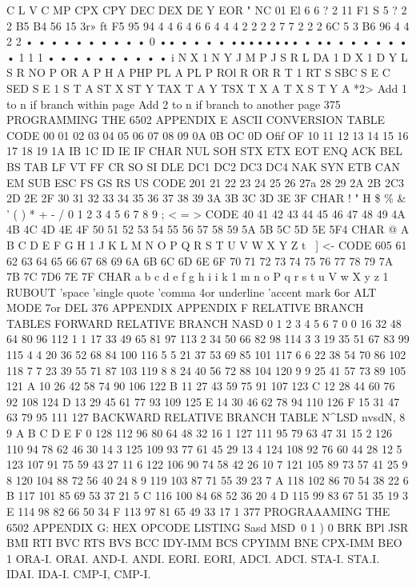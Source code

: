 \documentclass{book}
\begin{document}
{{{{{{{{{{{{{{{{{{{{{{{{{{{{{{{{{{{{{{{{{{{{{{{{{{{{{{{{{{{{{{{{{{{{{{{{{{{{{{{{{{{{{{{{{{{{{{{{{{{{{{{{{{{{{{{{{{{{{{{{{{{{{{{{{{{{{{{{{{{{C L V
C MP
CPX
CPY
DEC
DEX
DE Y
EOR
" NC
01
El
6
6
?
2
11
F1
S
5
?
2
2
B5
B4
56
15
3r»
ft
F5
95
94
4
4
6
4
6
6
4
4
4
2
2
2
2
7
7
2
2
2
6C 5 3
B6
96
4
4
2
2
• •
• •
• •
• •
• •
0 ••
• •
• •
••••••••
• ••
• • •
• • • •
1
1
1
• •
• •
• •
• •
• •
i N X
1 N Y
J M P
J S R
L DA
1 D X
1 D Y
L S R
NO P
OR A
P H A
PHP
PL A
PL P
ROl
R OR
R T 1
RT S
SBC
S E C
SED
S E 1
S T A
ST X
ST Y
TAX
T A Y
TSX
T X A
T X S
T Y A
*2> Add 1 to n if branch within page
Add 2 to n if branch to another page
375
PROGRAMMING THE 6502
APPENDIX E
ASCII CONVERSION TABLE
CODE
00
01
02
03
04
05
06
07
08
09
0A
0B
OC
0D
Ofif
OF
10
11
12
13
14
15
16
17
18
19
1A
IB
1C
ID
IE
IF
CHAR
NUL
SOH
STX
ETX
EOT
ENQ
ACK
BEL
BS
TAB
LF
VT
FF
CR
SO
SI
DLE
DC1
DC2
DC3
DC4
NAK
SYN
ETB
CAN
EM
SUB
ESC
FS
GS
RS
US
CODE
201
21
22
23
24
25
26
27a
28
29
2A
2B
2C3
2D
2E
2F
30
31
32
33
34
35
36
37
38
39
3A
3B
3C
3D
3E
3F
CHAR
!
"
H
\$
\%
&
'
(
)
*
+
-
/
0
1
2
3
4
5
6
7
8
9
;
<
=
>
CODE
40
41
42
43
44
45
46
47
48
49
4A
4B
4C
4D
4E
4F
50
51
52
53
54
55
56
57
58
59
5A
5B
5C
5D
5E
5F4
CHAR
@
A
B
C
D
E
F
G
H
1
J
K
L
M
N
O
P
Q
R
S
T
U
V
W
X
Y
Z
t
\
]
<-
CODE
605
61
62
63
64
65
66
67
68
69
6A
6B
6C
6D
6E
6F
70
71
72
73
74
75
76
77
78
79
7A
7B
7C
7D6
7E
7F
CHAR
a
b
c
d
e
f
g
h
i
i
k
1
m
n
o
P
q
r
s
t
u
V
w
X
y
z
{
1
}
RUBOUT
'space
'single quote
'comma
4or underline
'accent mark
6or ALT MODE
7or DEL
376
APPENDIX
APPENDIX F
RELATIVE BRANCH TABLES
FORWARD RELATIVE BRANCH
NASD
0
1
2
3
4
5
6
7
0
0
16
32
48
64
80
96
112
1
1
17
33
49
65
81
97
113
2
34
50
66
82
98
114
3
3
19
35
51
67
83
99
115
4
4
20
36
52
68
84
100
116
5
5
21
37
53
69
85
101
117
6
6
22
38
54
70
86
102
118
7
7
23
39
55
71
87
103
119
8
8
24
40
56
72
88
104
120
9
9
25
41
57
73
89
105
121
A
10
26
42
58
74
90
106
122
B
11
27
43
59
75
91
107
123
C
12
28
44
60
76
92
108
124
D
13
29
45
61
77
93
109
125
E
14
30
46
62
78
94
110
126
F
15
31
47
63
79
95
111
127
BACKWARD RELATIVE BRANCH TABLE
N^LSD
nvsdN,
8
9
A
B
C
D
E
F
0
128
112
96
80
64
48
32
16
1
127
111
95
79
63
47
31
15
2
126
110
94
78
62
46
30
14
3
125
109
93
77
61
45
29
13
4
124
108
92
76
60
44
28
12
5
123
107
91
75
59
43
27
11
6
122
106
90
74
58
42
26
10
7
121
105
89
73
57
41
25
9
8
120
104
88
72
56
40
24
8
9
119
103
87
71
55
39
23
7
A
118
102
86
70
54
38
22
6
B
117
101
85
69
53
37
21
5
C
116
100
84
68
52
36
20
4
D
115
99
83
67
51
35
19
3
E
114
98
82
66
50
34
F
113
97
81
65
49
33
17
1
377
PROGRAAAMING THE 6502
APPENDIX G:
HEX OPCODE LISTING
Sasd
MSD\,
0
1
)
0
BRK
BPl
JSR
BMI
RTI
BVC
RTS
BVS
BCC
IDY-IMM
BCS
CPYIMM
BNE
CPX-IMM
BEO
1
ORA-I.
ORAI.
AND-I.
ANDI.
EORI.
EORI,
ADCI.
ADCI.
STA-I.
STA.I.
IDAI.
IDA-I.
CMP-I,
CMP-I.
}}}}}}}}}}}}}}}}}}}}}}}}}}}}}}}}}}}}}}}}}}}}}}}}}}}}}}}}}}}}}}}}}}}}}}}}}}}}}}}}}}}}}}}}}}}}}}}}}}}}}}}}}}}}}}}}}}}}}}}}}}}}}}}}}}}}}}}}}}}}
\end{document}
